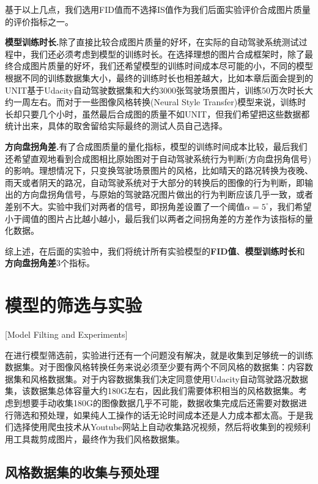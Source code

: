 基于以上几点，我们选用FID值而不选择IS值作为我们后面实验评价合成图片质量的评价指标之一。

\textbf{模型训练时长.}\quad 除了直接比较合成图片质量的好坏，在实际的自动驾驶系统测试过程中，我们还必须考虑到模型的训练时长。在选择理想的图片合成框架时，除了最终合成图片质量的好坏，我们还希望模型的训练时间成本尽可能的小，不同的模型根据不同的训练数据集大小，最终的训练时长也相差越大，比如本章后面会提到的UNIT\cite{UNIT}基于Udacity自动驾驶数据集\cite{udacity_dataset}和大约3000张驾驶场景图片，训练50万次时长大约一周左右。而对于一些图像风格转换(Neural Style Transfer)模型来说，训练时长却只要几个小时，虽然最后合成图的质量不如UNIT，但我们希望把这些数据都统计出来，具体的取舍留给实际最终的测试人员自己选择。 

\textbf{方向盘拐角差.}\quad 有了合成图质量的量化指标，模型的训练时间成本比较，最后我们还希望直观地看到合成图相比原始图对于自动驾驶系统行为判断(方向盘拐角信号)的影响。理想情况下，只变换驾驶场景图片的风格，比如晴天的路况转换为夜晚、雨天或者阴天的路况，自动驾驶系统对于大部分的转换后的图像的行为判断，即输出的方向盘拐角信号，与原始的驾驶路况图片做出的行为判断应该几乎一致，或者差别不大。实验中我们对两者的信号，即拐角差设置了一个阈值$\alpha=5^{\circ}$，我们希望小于阈值的图片占比越小越小，最后我们以两者之间拐角差的方差作为该指标的量化数据。

综上述，在后面的实验中，我们将统计所有实验模型的\textbf{FID值}、\textbf{模型训练时长}和\textbf{方向盘拐角差}3个指标。 


\section{模型的筛选与实验}[Model Filting and Experiments]

在进行模型筛选前，实验进行还有一个问题没有解决，就是收集到足够统一的训练数据集。对于图像风格转换任务来说必须至少要有两个不同风格的数据集：内容数据集和风格数据集。对于内容数据集我们决定同意使用Udacity自动驾驶路况数据集\cite{udacity_dataset}，该数据集总体容量大约180G左右，因此我们需要体积相当的风格数据集。考虑到想要手动收集180G的图像数据几乎不可能，数据收集完成后还需要对数据进行筛选和预处理，如果纯人工操作的话无论时间成本还是人力成本都太高。于是我们选择使用爬虫技术从Youtube网站上自动收集路况视频，然后将收集到的视频利用工具裁剪成图片，最终作为我们风格数据集。

\subsection{风格数据集的收集与预处理}

